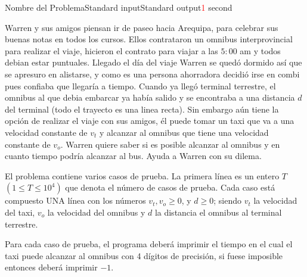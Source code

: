 \begin{problem}{Nombre del Problema}{Standard input}{Standard output}{\textcolor{red}{1} second}{}

       
Warren y sus amigos piensan ir de paseo hacia Arequipa, para celebrar sus buenas notas en todos los cursos.
Ellos contrataron un omnibus interprovincial para realizar el viaje, hicieron el contrato para viajar a las $5:00$ am y todos debian estar
puntuales. Llegado el día del viaje Warren se quedó dormido así que se apresuro en alistarse, y como es una persona ahorradora
decidió irse en combi pues confiaba que llegaría a tiempo. Cuando ya llegó terminal terrestre, el omnibus al que debia embarcar ya había salido y se encontraba a una distancia $d$ del terminal (todo el trayecto es una linea recta).
Sin embargo aún tiene la opción de realizar el viaje con sus amigos, él puede tomar un taxi que va a una velocidad constante de $v_t$ y alcanzar al omnibus que tiene una velocidad constante de
$v_o$. Warren quiere saber si es posible alcanzar al omnibus y en cuanto tiempo podría alcanzar al bus. Ayuda a Warren con su dilema.


\InputFile
El problema contiene varios casos de prueba. La primera l\'inea es un entero $T$ $(1\leq T \leq 10^4)$ que denota el número de casos de prueba. Cada caso está compuesto UNA l\'inea con los números $v_t,v_o \geq 0$, y $d \geq 0$; siendo $v_t$ la velocidad del taxi, $v_o$ la velocidad del omnibus y $d$ la distancia el omnibus al terminal terrestre.

\OutputFile
Para cada caso de prueba, el programa deber\'a imprimir el tiempo en el cual el taxi puede alcanzar al omnibus con 4 dígitos de precisión, si fuese imposible entonces deber\'a imprimir $-1$.

\Example

\begin{example}
\end{example}

\end{problem}
